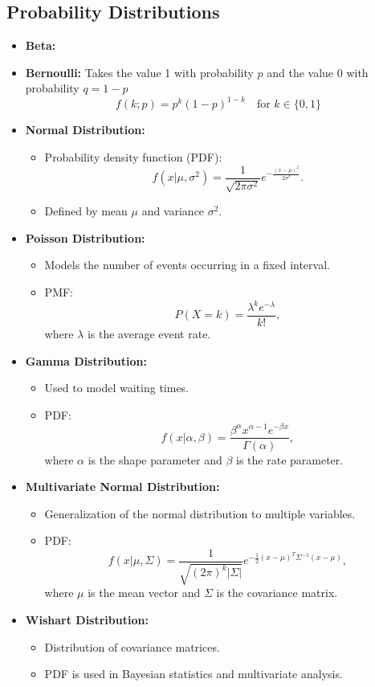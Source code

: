 \documentclass[12pt,a4paper]{article}
\begin{document}
\subsection{Probability Distributions}
\begin{itemize}
\item \textbf{Beta: }
\item \textbf{Bernoulli: } Takes the value 1 with probability 
${\displaystyle p}$ and the value 0 with probability 
${\displaystyle q=1-p}$
\[\displaystyle f(k;p)=p^{k}(1-p)^{1-k}\quad {\text{for }}k\in \{0,1\}\]
    \item \textbf{Normal Distribution:}
    \begin{itemize}
        \item Probability density function (PDF):
        \[ f(x | \mu, \sigma^2) = \frac{1}{\sqrt{2\pi\sigma^2}} e^{-\frac{(x - \mu)^2}{2\sigma^2}}. \]
        \item Defined by mean $\mu$ and variance $\sigma^2$.
    \end{itemize}
    \item \textbf{Poisson Distribution:}
    \begin{itemize}
        \item Models the number of events occurring in a fixed interval.
        \item PMF:
        \[ P(X = k) = \frac{\lambda^k e^{-\lambda}}{k!}, \]
        where $\lambda$ is the average event rate.
    \end{itemize}
    \item \textbf{Gamma Distribution:}
    \begin{itemize}
        \item Used to model waiting times.
        \item PDF:
        \[ f(x | \alpha, \beta) = \frac{\beta^\alpha x^{\alpha-1} e^{-\beta x}}{\Gamma(\alpha)}, \]
        where $\alpha$ is the shape parameter and $\beta$ is the rate parameter.
    \end{itemize}
    \item \textbf{Multivariate Normal Distribution:}
    \begin{itemize}
        \item Generalization of the normal distribution to multiple variables.
        \item PDF:
        \[ f(x | \mu, \Sigma) = \frac{1}{\sqrt{(2\pi)^k |\Sigma|}} e^{-\frac{1}{2}(x - \mu)^T \Sigma^{-1} (x - \mu)}, \]
        where $\mu$ is the mean vector and $\Sigma$ is the covariance matrix.
    \end{itemize}
    \item \textbf{Wishart Distribution:}
    \begin{itemize}
        \item Distribution of covariance matrices.
        \item PDF is used in Bayesian statistics and multivariate analysis.
    \end{itemize}
\end{itemize}
\end{document}
